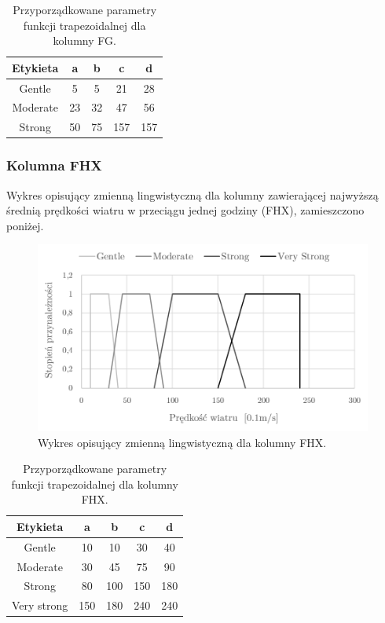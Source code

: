 \documentclass{classrep}
\begin{document}
\begin{table}[H]
	\centering
	\begin{tabular}{c c c c c} 
		\hline
		\textbf{Etykieta} & \textbf{a} & \textbf{b} & \textbf{c} & \textbf{d}\\ [0.5ex] 
		\hline
		\hline 
Gentle	 & 5 & 5 & 21 & 28 \\
Moderate & 23 & 32 & 47 & 56 \\
Strong	 & 50 & 75 & 157 & 157 \\
		\hline
	\end{tabular}
	\caption{Przyporządkowane parametry funkcji trapezoidalnej dla kolumny FG.}
\end{table}

\clearpage



\subsubsection{Kolumna FHX}
Wykres opisujący zmienną lingwistyczną dla kolumny zawierającej najwyższą średnią prędkości wiatru w przeciągu jednej godziny (FHX), zamieszczono poniżej.
\begin{figure}[H]
	\centering
	\includegraphics[width=0.99\textwidth]{Pictures/TermsCharts/FHX.png}
	\caption{Wykres opisujący zmienną lingwistyczną dla kolumny FHX.}
\end{figure}

\begin{table}[H]
	\centering
	\begin{tabular}{c c c c c} 
		\hline
		\textbf{Etykieta} & \textbf{a} & \textbf{b} & \textbf{c} & \textbf{d}\\ [0.5ex] 
		\hline
		\hline 
Gentle	 & 10 & 10 & 30 & 40 \\
Moderate & 30 & 45 & 75 & 90 \\
Strong	 & 80 & 100 & 150 & 180 \\
Very strong & 150 & 180 & 240 & 240 \\
		\hline
	\end{tabular}
	\caption{Przyporządkowane parametry funkcji trapezoidalnej dla kolumny FHX.}
\end{table}
\end{document}
